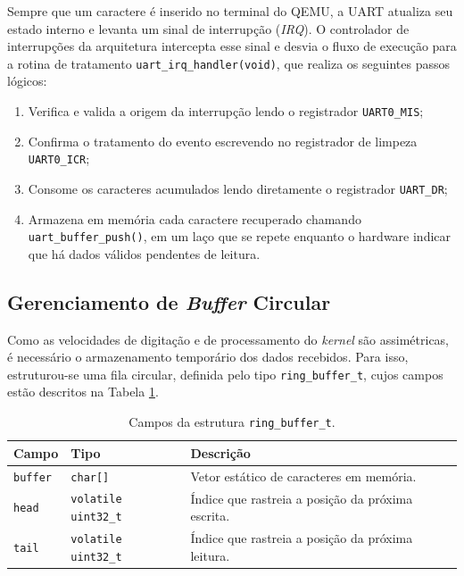 Sempre que um caractere é inserido no terminal do QEMU, a UART atualiza seu estado interno e levanta um sinal de interrupção (\textit{IRQ}). O controlador de interrupções da arquitetura intercepta esse sinal e desvia o fluxo de execução para a rotina de tratamento \texttt{uart\_irq\_handler(void)}, que realiza os seguintes passos lógicos:

\begin{enumerate}
    \item Verifica e valida a origem da interrupção lendo o registrador \texttt{UART0\_MIS};
    \item Confirma o tratamento do evento escrevendo no registrador de limpeza \texttt{UART0\_ICR};
    \item Consome os caracteres acumulados lendo diretamente o registrador \texttt{UART\_DR};
    \item Armazena em memória cada caractere recuperado chamando \texttt{uart\_buffer\_push()}, em um laço que se repete enquanto o hardware indicar que há dados válidos pendentes de leitura.
\end{enumerate}

\subsection{Gerenciamento de \textit{Buffer} Circular}

Como as velocidades de digitação e de processamento do \textit{kernel} são assimétricas, é necessário o armazenamento temporário dos dados recebidos. Para isso, estruturou-se uma fila circular, definida pelo tipo \texttt{ring\_buffer\_t}, cujos campos estão descritos na Tabela \ref{tab:ring-buffer-campos}.

\begin{table}[htbp]
    \centering
    \renewcommand{\arraystretch}{1.3}
    \begin{tabular}{@{}llp{7.5cm}@{}}
        \hline
        \textbf{Campo} & \textbf{Tipo} & \textbf{Descrição} \\
        \hline
        \texttt{buffer} & \texttt{char[]} & Vetor estático de caracteres em memória. \\
        \texttt{head} & \texttt{volatile uint32\_t} & Índice que rastreia a posição da próxima escrita. \\
        \texttt{tail} & \texttt{volatile uint32\_t} & Índice que rastreia a posição da próxima leitura. \\
        \hline
    \end{tabular}
    \caption{Campos da estrutura \texttt{ring\_buffer\_t}.}
    \label{tab:ring-buffer-campos}
\end{table}

